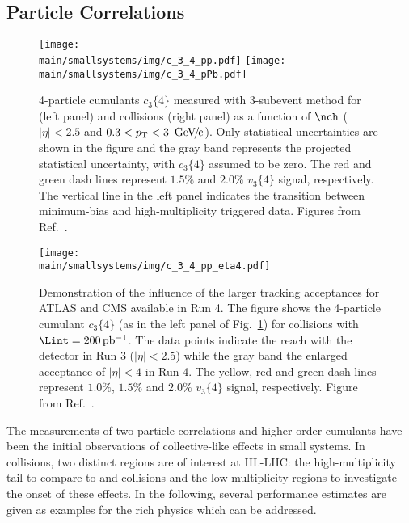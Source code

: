 \documentclass[../report.tex]{subfiles}
\providecommand{\main}{..}
\begin{document}
\subsection{Particle Correlations}
\label{sect:smallsystems_correlations}

\begin{figure}[t]
\centering
\texttt{[image: \\main/smallsystems/img/c\_3\_4\_pp.pdf]}
\hfill
\texttt{[image: \\main/smallsystems/img/c\_3\_4\_pPb.pdf]}
\caption{4-particle cumulants $c_3\{4\}$ measured with 3-subevent method for \pp (left panel) and \pPb collisions (right panel) as a function of $\nch$ ($|\eta| < 2.5$ and $0.3 < \pT < \unit[3]{\UGeVc}$). Only statistical uncertainties are shown in the figure and the gray band represents the projected statistical uncertainty, with $c_3\{4\}$ assumed to be zero. The red and green dash lines represent $1.5\%$ and $2.0\%$ $v_3\{4\}$ signal, respectively. The vertical line in the left panel indicates the transition between minimum-bias and high-multiplicity triggered data. Figures from Ref.~\cite{ATL-PHYS-PUB-2018-014}.}
\label{fig:smallsystems_corr_cumulants}
\end{figure}

\begin{figure}[t]
\centering
\texttt{[image: \\main/smallsystems/img/c\_3\_4\_pp\_eta4.pdf]}
\caption{Demonstration of the influence of the larger tracking acceptances for ATLAS and CMS available in Run 4. The figure shows the 4-particle cumulant $c_3\{4\}$ (as in the left panel of Fig.~\ref{fig:smallsystems_corr_cumulants}) for \pp collisions with $\Lint = \unit[200]{pb^{-1}}$. The data points indicate the reach with the detector in Run 3 ($|\eta| < 2.5$) while the gray band the enlarged acceptance of $|\eta| < 4$ in Run 4. The yellow, red and green dash lines represent $1.0\%$, $1.5\%$ and $2.0\%$ $v_3\{4\}$ signal, respectively. Figure from Ref.~\cite{ATL-PHYS-PUB-2018-014}.}
\label{fig:smallsystems_corr_cumulants_eta4}
\end{figure}

The measurements of two-particle correlations and higher-order cumulants have been the initial observations of collective-like effects in small systems. In \pp collisions, two distinct regions are of interest at HL-LHC: the high-multiplicity tail to compare to \pPb and \PbPb collisions and the low-multiplicity regions to investigate the onset of these effects. In the following, several performance estimates are given as examples for the rich physics which can be addressed.
\end{document}
